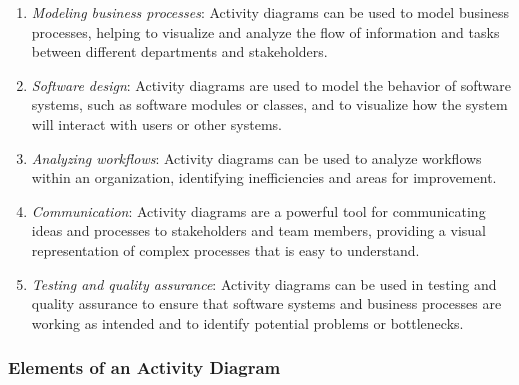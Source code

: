 \documentclass[11pt]{article}
\begin{document}
\begin{enumerate}
	\item \textit{Modeling business processes}: Activity diagrams can be used to model business processes, helping to visualize and analyze the flow of information and tasks between different departments and stakeholders.
	\item \textit{Software design}: Activity diagrams are used to model the behavior of software systems, such as software modules or classes, and to visualize how the system will interact with users or other systems.
	\item \textit{Analyzing workflows}: Activity diagrams can be used to analyze workflows within an organization, identifying inefficiencies and areas for improvement.
	\item \textit{Communication}: Activity diagrams are a powerful tool for communicating ideas and processes to stakeholders and team members, providing a visual representation of complex processes that is easy to understand.
	\item \textit{Testing and quality assurance}: Activity diagrams can be used in testing and quality assurance to ensure that software systems and business processes are working as intended and to identify potential problems or bottlenecks.
\end{enumerate}

\subsubsection{Elements of an Activity Diagram}
\end{document}
